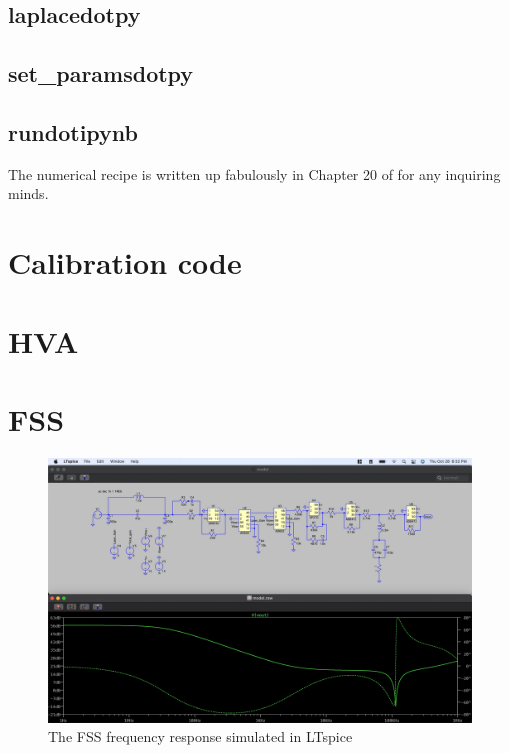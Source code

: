 \subsection{laplacedotpy}


\subsection{set\_paramsdotpy}


\subsection{rundotipynb}
The numerical recipe is written up fabulously in Chapter 20  of \cite{Press:2007} for any inquiring minds.


\section{Calibration code}\label{sec:calibrationcode}


\section{HVA}

\section{FSS}

\begin{figure}[H]
  \begin{center}
    \includegraphics[width=\textwidth]{figs/ALGAAS/tfs/spice_FSS_tf.pdf}
    \caption{The FSS frequency response simulated in LTspice}
  \end{center}
  \label{fig:spiceFSS}
\end{figure}

